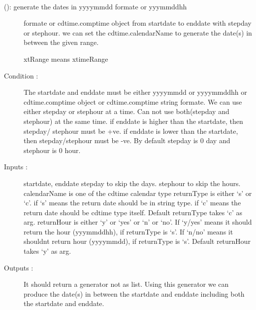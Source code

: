 \documentclass[letterpaper,10pt,english]{sphinxmanual}
\begin{document}
\begin{fulllineitems}
\begin{fulllineitems}
\label{diagnosisutils:xml_data_access.TimeUtility.xtRange}~\begin{description}
\item[{{\hyperref[diagnosisutils:xml_data_access.TimeUtility.xtRange]{}} (): generate the dates in yyyymmdd formate or yyymmddhh}] \leavevmode
formate or cdtime.comptime object from startdate to enddate
with stepday or stephour.
we can set the cdtime.calendarName to generate the date(s)
in between the given range.

xtRange means xtimeRange

\item[{Condition :}] \leavevmode
The startdate and enddate must be either yyyymmdd or
yyyymmddhh or cdtime.comptime object or cdtime.comptime
string formate.
We can use either stepday or stephour at a time. Can not use
both(stepday and stephour) at the same time.
if enddate is higher than the startdate, then stepday/
stephour must be +ve.
if enddate is lower than the startdate, then stepday/stephour
must be -ve.
By default stepday is 0 day and stephour is 0 hour.

\item[{Inputs :}] \leavevmode
startdate, enddate
stepday to skip the days.
stephour to skip the hours.
calendarName is one of the cdtime calendar type
returnType is either `s' or `c'. if `s' means the return date
should be in string type. if `c' means the return date should
be cdtime type itself.
Default returnType takes `c' as arg.
returnHour is either `y' or `yes' or `n' or `no'. If `y/yes'
means it should return the hour (yyymmddhh), if returnType
is `s'. If `n/no' means it shouldnt return hour (yyyymmdd),
if returnType is `s'.
Default returnHour takes `y' as arg.

\item[{Outputs :}] \leavevmode
It should return a generator not as list.
Using this generator we can produce the date(s) in between
the startdate and enddate including both the startdate and
enddate.


\end{description}
\end{fulllineitems}
\end{fulllineitems}
\end{document}
